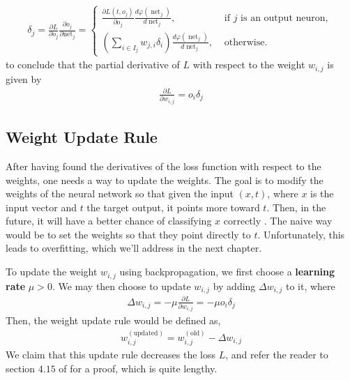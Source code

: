 \documentclass{article}
\DeclareMathOperator{\net}{net}
\begin{document}
\begin{enumerate}
\begin{equation*}
  \begin{split}
    \delta_j = {\frac {\partial L}{\partial o_{j}}}{\frac {\partial o_{j}}{\partial {\text{net}}_{j}}}= 
    \begin{cases}
      \frac{\partial {L(t, o_j)}}{\partial {o_j}} \frac{d {\varphi (\net_j)}}{d {\net_j}}, &\text{ if } j \text{ is an output neuron, }\\
      \left( \sum^{}_{i\in I_j} w_{j,i} \delta_i\right) \frac{d {\varphi (\net_j)}}{d {\net_j}} {}, &\text{ otherwise.} 
    \end{cases}
  \end{split}
\end{equation*}
to conclude that the partial derivative of $L$ with respect to the weight $w_{i,j}$ is given by 
\begin{equation*}
  \begin{split}
    \frac{\partial {L}}{\partial {w_{i,j}}} = o_i \delta_j
  \end{split}
\end{equation*}
      \end{enumerate}
\subsection{Weight Update Rule}%
  \label{sub:Weight Update Rule}
  After having found the derivatives of the loss function with respect to the weights, one needs a way to update the weights. The goal is to modify the weights of the neural network so that given the input $(x,t)$, where $x$ is the input vector and $t$ the target output, it points more toward $t$. Then, in the future, it will have a better chance of classifying $x$ correctly \citep{Hagan_Martin}. The naive way would be to set the weights so that they point directly to $t$. Unfortunately, this leads to overfitting, which we'll address in the next chapter.
  
  To update the weight $w_{i,j}$ using backpropagation, we first choose a \textbf{learning rate} $\mu> 0$. We may then choose to update $w_{i,j}$ by adding $\Delta w_{i,j}$ to it, where
  \begin{equation*}
    \begin{split}
      \Delta w_{i,j} = -\mu \frac{\partial {L}}{\partial {w_{i,j}}}  = - \mu  o_i \delta_j
    \end{split}
  \end{equation*}
 Then, the weight update rule would be defined as, 
 \begin{equation*}
  \begin{split}
    w_{i,j}^{(\text{updated})} =  w_{i,j}^{(\text{old})} - \Delta w_{i,j} 
  \end{split}
 \end{equation*}
 We claim that this update rule decreases the loss $L$, and refer the reader to section $4.15$ of \cite{Hagan_Martin} for a proof, which is quite lengthy.  
\end{document}
